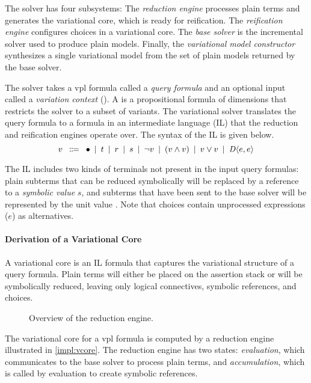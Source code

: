 The solver has four subsystems: The \emph{reduction engine} processes plain
terms and generates the variational core, which is ready for reification.
The \emph{reification engine} configures choices in a variational core. The
\textit{base solver} is the incremental solver used to produce plain models.
Finally, the \emph{variational model constructor} synthesizes a single
variational model from the set of plain models returned by the base solver.

The solver takes a \ac{vpl} formula called a \emph{query formula} and an optional
input called a \emph{variation context} (\vc{}). A \vc{} is a propositional
formula of dimensions that restricts the solver to a subset of variants.
%
The variational solver translates the query formula to a formula in an
intermediate language (IL) that the reduction and reification engines operate
over. The syntax of the IL is given below.
%
\[
  v \hquad \Coloneqq\hquad \unit{}
  \hquad|\hquad t
  \hquad|\hquad r
  \hquad|\hquad s
  \hquad|\hquad \neg v
  \hquad|\hquad (v \wedge v)
  \hquad|\hquad v \vee v
  \hquad|\hquad \chc[D]{e,e}
\]
%

The IL includes two kinds of terminals not present in the input query formulas:
plain subterms that can be reduced symbolically will be replaced by a reference
to a \emph{symbolic value} $s$, and subterms that have been sent to the base
solver will be represented by the unit value \unit{}.
%
Note that choices contain unprocessed expressions ($e$) as alternatives.


\paragraph{Derivation of a Variational Core}
\label{ssec:impl:accum}

A variational core is an IL formula that captures the variational structure of
a query formula. Plain terms will either be placed on the assertion stack or
will be symbolically reduced, leaving only logical connectives, symbolic
references, and choices.

\begin{figure}
  \centering
    
    \caption{Overview of the reduction engine.}%
    \label{impl:vcore}
\end{figure}


The variational core for a \ac{vpl} formula is computed by a reduction
engine illustrated in \autoref{impl:vcore}. The reduction engine has two
states: \emph{evaluation}, which communicates to the base solver to process
plain terms, and \emph{accumulation}, which is called by evaluation to create
symbolic references.




